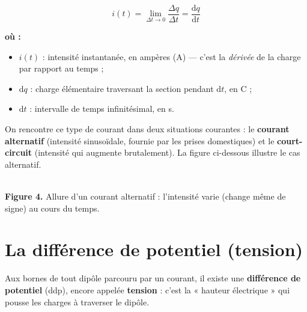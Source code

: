\documentclass[11pt,a4paper]{article}
\newenvironment{ou}{%
  \par\smallskip\noindent\textbf{où :}\nopagebreak
  \begin{itemize}[leftmargin=1.8em,topsep=2pt,itemsep=1.5pt,parsep=0pt]}%
  {\end{itemize}}
\newcommand{\dd}{\mathrm{d}}
\begin{document}
\begin{formule}
\[ \boxed{\,i(t) = \lim_{\Delta t \to 0}\dfrac{\Delta q}{\Delta t} = \dfrac{\dd q}{\dd t}\,} \]
\begin{ou}
  \item $i(t)$ : intensité instantanée, en ampères (\si{\ampere}) — c'est la \emph{dérivée} de la
        charge par rapport au temps ;
  \item $\dd q$ : charge élémentaire traversant la section pendant $\dd t$, en \si{\coulomb} ;
  \item $\dd t$ : intervalle de temps infinitésimal, en \si{\second}.
\end{ou}
\end{formule}

On rencontre ce type de courant dans deux situations courantes : le \textbf{courant alternatif}
(intensité sinusoïdale, fournie par les prises domestiques) et le \textbf{court-circuit}
(intensité qui augmente brutalement). La figure ci-dessous illustre le cas alternatif.

\begin{center}
\\[2pt]
{\footnotesize\textbf{Figure 4.} Allure d'un courant alternatif : l'intensité varie (change même de signe) au cours du temps.}
\end{center}

\section{La différence de potentiel (tension)}
\begin{definition}
Aux bornes de tout dipôle parcouru par un courant, il existe une \textbf{différence de potentiel}
(ddp), encore appelée \textbf{tension} : c'est la « hauteur électrique » qui pousse les charges à
traverser le dipôle.
\end{definition}
\end{document}
